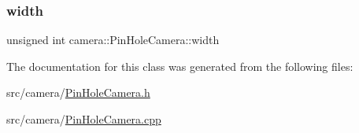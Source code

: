 \mbox{\label{classcamera_1_1PinHoleCamera_a84af11864219ddf7d2e3ddb0a7888d56}} 
\subsubsection{\texorpdfstring{width}{width}}
{\footnotesize\ttfamily unsigned int camera\+::\+Pin\+Hole\+Camera\+::width\hspace{0.3cm}{\ttfamily [private]}}



The documentation for this class was generated from the following files\+:\begin{DoxyCompactItemize}
\item 
src/camera/\mbox{\hyperlink{PinHoleCamera_8h}{Pin\+Hole\+Camera.\+h}}\item 
src/camera/\mbox{\hyperlink{PinHoleCamera_8cpp}{Pin\+Hole\+Camera.\+cpp}}\end{DoxyCompactItemize}
